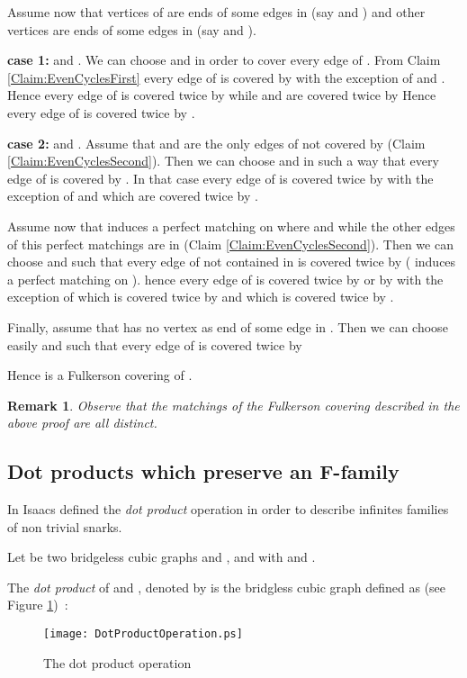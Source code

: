 \documentclass{amsart}
\newtheorem{rem}[thm]{Remark}
\theoremstyle{definition}
\theoremstyle{remark}
\newenvironment{prf}{{\bf \noindent Proof } }{\hfill\\}
\begin{document}
\begin{prf}
Assume now that  vertices of  are ends of some edges in
 (say  and ) and  other vertices are ends of
some edges in  (say  and ).



 {\bf case 1:}  and . We can choose 
and  in order to cover every edge of . From Claim
\ref{Claim:EvenCyclesFirst} every edge of  is covered by
 with the exception of  and
. Hence every edge of  is covered twice by
 while  and
 are covered twice by 
Hence every edge of  is covered twice by .

 {\bf case 2:}  and .
Assume that  and  are the only edges of
 not covered by  (Claim
\ref{Claim:EvenCyclesSecond}). Then we can choose  and 
in such a way that every edge of  is covered by . In that case every edge of  is covered twice by
 with the exception of
 and  which are covered twice by .

Assume now that   induces a perfect matching on
 where  and 
while the other edges of this perfect matchings are in  (Claim \ref{Claim:EvenCyclesSecond}). Then we can choose
 and  such that every edge of  not contained
in  is covered twice by  ( induces a perfect matching on ). hence every
edge of  is covered twice by  or by  with the exception of  which is covered
twice by  and  which is covered twice
by .


Finally, assume that  has no vertex as end of some edge in
. Then we can choose easily  and
 such that every edge of  is covered twice by


Hence  is a Fulkerson covering of .
\end{prf}
\begin{rem} \label{Rem:TousDistincts}
Observe that the matchings of the Fulkerson covering described in the above
proof are all distinct.
\end{rem}
\subsection{Dot products which preserve an F-family}
In \cite{Isa75} Isaacs defined the {\em dot product} operation in order to
describe infinites families of non trivial snarks.

Let  be two bridgeless cubic graphs and
,  and
 with
 and
.

The {\em dot product} of   and , denoted by 
is the bridgless cubic graph  defined
as  (see Figure \ref{Fig:DotProduct})~:


\begin{figure}
\begin{center}
\texttt{[image: DotProductOperation.ps]}
\end{center}
\caption{The dot product operation\label{Fig:DotProduct}} 
\end{figure}
\end{document}
